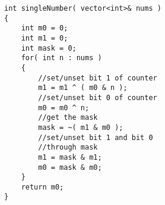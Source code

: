 \setcounter{lstlisting}{0}
\begin{lstlisting}[style=customc, caption={Bitwise}]
int singleNumber( vector<int>& nums )
{
    int m0 = 0;
    int m1 = 0;
    int mask = 0;
    for( int n : nums )
    {
        //set/unset bit 1 of counter
        m1 = m1 ^ ( m0 & n );
        //set/unset bit 0 of counter
        m0 = m0 ^ n;
        //get the mask
        mask = ~( m1 & m0 );
        //set/unset bit 1 and bit 0
        //through mask
        m1 = mask & m1;
        m0 = mask & m0;
    }
    return m0;
}
\end{lstlisting}
